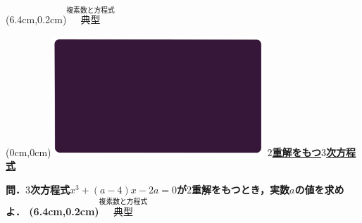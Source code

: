 \documentclass[10pt,
fleqn,
dvipdfmx,
uplatex
]{jsarticle}
\begin{document}
\at(6.4cm,0.2cm){\small\color{bradorange}$\overset{\text{複素数と方程式}}{\text{典型}}$}


\newpage



\at(0cm,0cm){\includegraphics[width=8cm,bb=0 0 1920 1080]{./youtube/thumbnails/templates/smart_background/複素数と方程式.jpeg}}
{\color{orange}\bf\boldmath\LARGE\underline{$2$重解をもつ$3$次方程式}}\vspace{0.3zw}

\LARGE 
\bf\boldmath 問．$3$次方程式$x^3+\left(a-4\right)x-2a=0$が$2$重解をもつとき，実数$a$の値を求めよ．
\at(6.4cm,0.2cm){\small\color{bradorange}$\overset{\text{複素数と方程式}}{\text{典型}}$}
\end{document}
